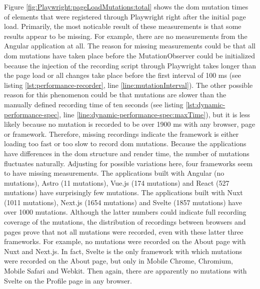 \documentclass[a4paper, 10pt]{article}
\begin{document}
Figure \ref{fig:Playwright:pageLoadMutations:total} shows the \acrshort{dom} mutation times of elements that were registered through Playwright right after the initial page load.
Primarily, the most noticable result of these measurements is that some results appear to be missing.
For example, there are no measurements from the Angular application at all.
The reason for missing measurements could be that all \acrshort{dom} mutations have taken place before the MutationObserver could be initialized because the injection of the recording script through Playwright takes longer than the page load or all changes take place before the first interval of 100 ms (see listing \ref{lst:performance-recorder}, line \ref{line:mutationInterval}).
The other possible reason for this phenomenon could be that mutations are slower than the manually defined recording time of ten seconds (see listing \ref{lst:dynamic-performance-spec}, line \ref{line:dynamic-performance-spec:maxTime}), but it is less likely because no mutation is recorded to be over 1900 ms with any browser, page or framework.
Therefore, missing recordings indicate the framework is either loading too fast or too slow to record \acrshort{dom} mutations.
Because the applications have differences in the \acrshort{dom} structure and render time, the number of mutations fluctuates naturally.
Adjusting for possible variations here, four frameworks seem to have missing measurements.
The applications built with Angular (no mutations), Astro (11 mutations), Vue.js (174 mutations) and React (527 mutations) have surprisingly few mutations.
The applications built with Nuxt (1011 mutations), Next.js (1654 mutations) and Svelte (1857 mutations) have over 1000 mutations.
Although the latter numbers could indicate full recording coverage of the mutations, the distribution of recordings between browsers and pages prove that not all mutations were recorded, even with these latter three frameworks.
For example, no mutations were recorded on the About page with Nuxt and Next.js.
In fact, Svelte is the only framework with which mutations were recorded on the About page, but only in Mobile Chrome, Chromium, Mobile Safari and Webkit.
Then again, there are apparently no mutations with Svelte on the Profile page in any browser.
\end{document}
